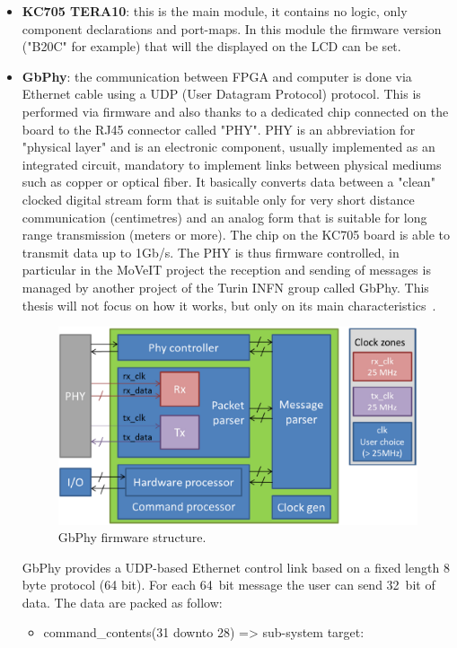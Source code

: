 \begin{itemize}
	\item \textbf{KC705 TERA10}: this is the main module, it contains no logic, only component declarations and port-maps. In this module the firmware version ("B20C" for example) that will the displayed on the LCD can be set.
	\item \textbf{GbPhy}: the communication between FPGA and computer is done via Ethernet cable using a UDP (User Datagram Protocol) protocol. This is performed via firmware and also thanks to a dedicated chip connected on the board to the RJ45 connector called "PHY".
	\newline
	PHY is an abbreviation for "physical layer" and is an electronic component, usually implemented as an integrated circuit, mandatory to implement links between physical mediums such as copper or optical fiber. It basically converts data between a "clean" clocked digital stream form that is suitable only for very short distance communication (centimetres) and an analog form that is suitable for long range transmission (meters or more).
	The chip on the KC705 board is able to transmit data up to 1Gb/s.
	\newline
	The PHY is thus firmware controlled, in particular in the MoVeIT project the reception and sending of messages is managed by another project of the Turin INFN group called GbPhy. This thesis will  not focus on how it works, but only on its main characteristics~\cite{gbphy}.     
	\begin{figure}[H]
		\centering
		\includegraphics[width=0.6\linewidth]{IMG/ch4/PHY100}
		\caption{GbPhy firmware structure.}
		\label{fig:phy100}
	\end{figure}
	\noindent GbPhy provides a UDP-based Ethernet control link based on a fixed length 8 byte protocol (64 bit).
	For each 64~bit message the user can send 32~bit of data. The data are packed as follow:
	\begin{itemize}
		\item command\_contents(31 downto 28) => sub-system target:

\end{itemize}
\end{itemize}
